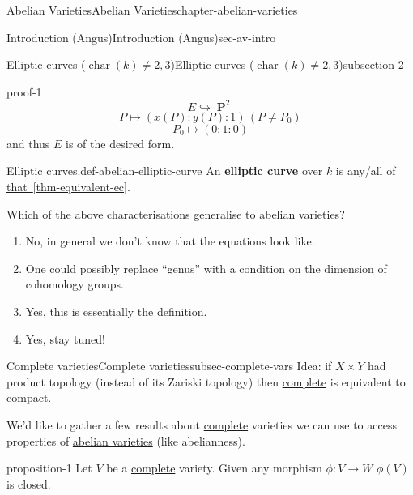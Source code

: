 \documentclass[oneside,10pt,]{book}
\newcommand{\terminology}[1]{\textbf{#1}}
\numberwithin{equation}{section}
\DeclareMathOperator{\characteristic}{char}
\DeclareMathOperator{\PP}{\mathbf{P}}
\begin{document}
\begin{chapterptx}{Abelian Varieties}{}{Abelian Varieties}{}{}{chapter-abelian-varieties}
\begin{sectionptx}{Introduction (Angus)}{}{Introduction (Angus)}{}{}{sec-av-intro}
\begin{subsectionptx}{Elliptic curves (\(\characteristic(k) \ne 2,3\))}{}{Elliptic curves (\(\characteristic(k) \ne 2,3\))}{}{}{subsection-2}
\begin{proofptx}{}{proof-1}
\begin{equation*}
E \hookrightarrow \PP^2
\end{equation*}
%
\begin{equation*}
P\mapsto (x(P):y(P): 1) \,(P\ne P_0)
\end{equation*}
%
\begin{equation*}
P_0 \mapsto (0:1 : 0)
\end{equation*}
and thus \(E\) is of the desired form.%
\end{proofptx}
\begin{definition}{Elliptic curves.}{def-abelian-elliptic-curve}%
\hypertarget{p-17}{}%
An \terminology{elliptic curve} over \(k\) is any/all of \hyperref[thm-equivalent-ec]{that~\ref{thm-equivalent-ec}}.%
\end{definition}
\hypertarget{p-18}{}%
Which of the above characterisations generalise to \hyperref[def-buntes-abvar]{abelian varieties}?\leavevmode%
\begin{enumerate}
\item\hypertarget{li-11}{}No, in general we don't know that the equations look like.%
\item\hypertarget{li-12}{}One could possibly replace ``genus'' with a condition on the dimension of cohomology groups.%
\item\hypertarget{li-13}{}Yes, this is essentially the definition.%
\item\hypertarget{li-14}{}Yes, stay tuned!%
\end{enumerate}
%
\end{subsectionptx}
%
%
\typeout{************************************************}
\typeout{************************************************}
%
\begin{subsectionptx}{Complete varieties}{}{Complete varieties}{}{}{subsec-complete-vars}
\hypertarget{p-19}{}%
Idea: if \(X \times Y\) had product topology (instead of its Zariski topology) then \hyperref[def-abelian-complete-var]{complete} is equivalent to compact.%
\par
\hypertarget{p-20}{}%
We'd like to gather a few results about \hyperref[def-abelian-complete-var]{complete} varieties we can use to access properties of \hyperref[def-buntes-abvar]{abelian varieties} (like abelianness).%
\begin{proposition}{}{}{proposition-1}%
\hypertarget{p-21}{}%
Let \(V\) be a \hyperref[def-abelian-complete-var]{complete} variety. Given any morphism \(\phi\colon V \to W\) \(\phi (V) \) is closed.%
\end{proposition}

\end{subsectionptx}
\end{sectionptx}
\end{chapterptx}
\end{document}
